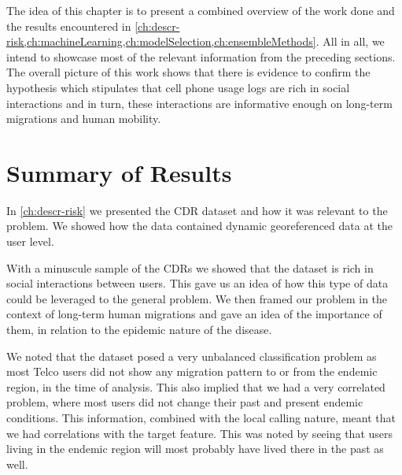 


The idea of this chapter is to present a combined overview of the work done and the results encountered in
\cref{ch:descr-risk,ch:machineLearning,ch:modelSelection,ch:ensembleMethods}.
All in all, we intend to showcase most of the relevant information from the preceding sections.
The overall picture of this work shows that there is evidence to confirm the hypothesis which stipulates that cell phone usage logs are rich in social interactions and in turn, these interactions are informative enough on long-term migrations and human mobility.

\chapter{Summary of Results}\label{ch:results}



In \cref{ch:descr-risk} we presented the CDR dataset and how it was relevant to the problem.
We showed how the data contained dynamic georeferenced data at the user level.

With a minuscule sample of the CDRs we showed that the dataset is rich in social interactions between users.
This gave us an idea of how this type of data could be leveraged to the general problem.
We then framed our problem in the context of long-term human migrations and gave an idea of the importance of them, in relation to the epidemic nature of the disease.

We noted that the dataset posed a very unbalanced classification problem as most Telco users did not show any migration pattern to or from the endemic region, in the time of analysis.
This also implied that we had a very correlated problem, where most users did not change their past and present endemic conditions.
This information, combined with the local calling nature, meant that we had correlations with the target feature.
This was noted by seeing that users living in the endemic region will most probably have lived there in the past as well.

